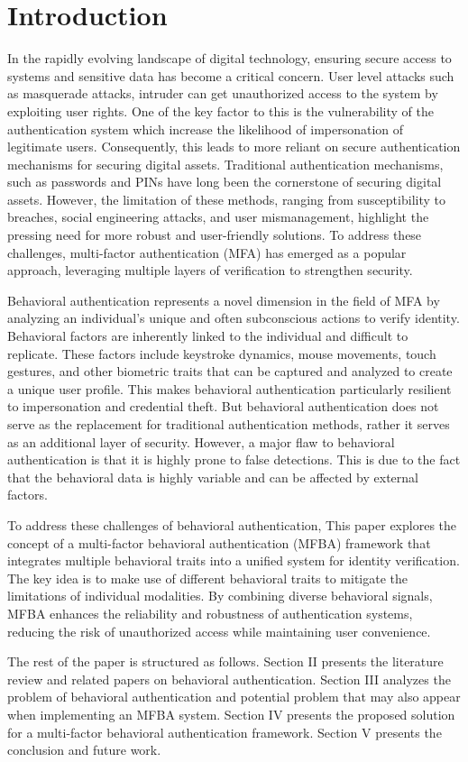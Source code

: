 
\section{Introduction}

In the rapidly evolving landscape of digital technology, ensuring secure access to systems and sensitive data has become a critical concern.
User level attacks such as masquerade attacks, intruder can get unauthorized access to the system by exploiting user rights.
One of the key factor to this is the vulnerability of the authentication system
which increase the likelihood of impersonation of legitimate users.
Consequently, this leads to more reliant on secure authentication mechanisms for securing digital assets.  
Traditional authentication mechanisms, such as passwords and PINs have long been the cornerstone of securing digital assets. However, the limitation of these methods, ranging from susceptibility to breaches, social engineering attacks, and user mismanagement, highlight the pressing need for more robust and user-friendly solutions. To address these challenges, multi-factor authentication (MFA) has emerged as a popular approach, leveraging multiple layers of verification to strengthen security.

Behavioral authentication represents a novel dimension in the field of MFA by analyzing an individual's unique and often subconscious actions to verify identity.
Behavioral factors are inherently linked to the individual and difficult to replicate.
These factors include keystroke dynamics, mouse movements, touch gestures, and other biometric traits that can be captured and analyzed to create a unique user profile.
This makes behavioral authentication particularly resilient to impersonation and credential theft.
But behavioral authentication does not serve as the replacement for traditional authentication methods, rather it serves as an additional layer of security. 
However, a major flaw to behavioral authentication is that it is highly prone to false detections.
This is due to the fact that the behavioral data is highly variable and can be affected by external factors.

To address these challenges of behavioral authentication, 
This paper explores the concept of a multi-factor behavioral authentication (MFBA) framework that integrates multiple behavioral traits into a unified system for identity verification.
The key idea is to make use of different behavioral traits to mitigate the limitations of individual modalities.
By combining diverse behavioral signals, MFBA enhances the reliability and robustness of authentication systems, reducing the risk of unauthorized access while maintaining user convenience.

The rest of the paper is structured as follows.
Section II presents the literature review and related papers on behavioral authentication.
Section III analyzes the problem of behavioral authentication and potential problem that may also appear when implementing an MFBA system. 
Section IV presents the proposed solution for a multi-factor behavioral authentication framework.
Section V presents the conclusion and future work.
